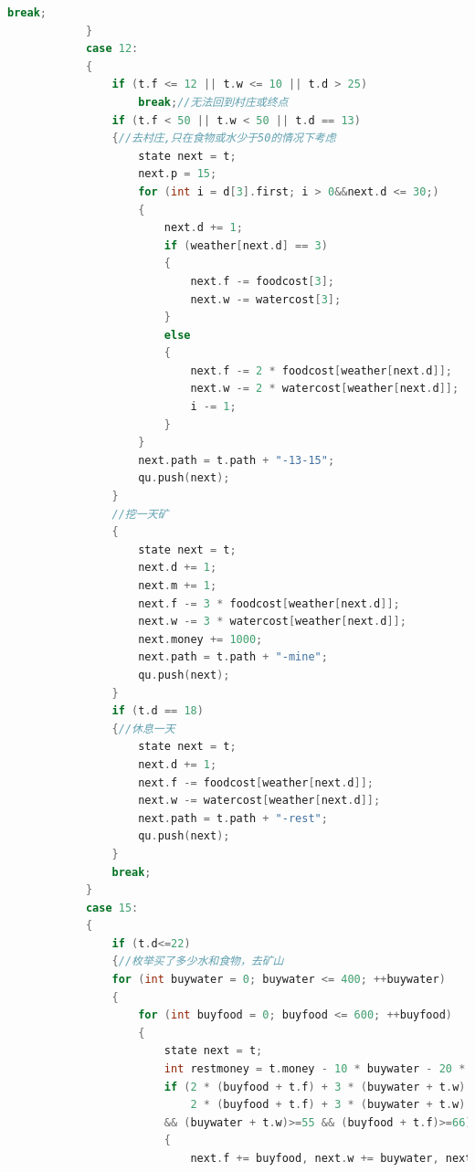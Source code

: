 \documentclass[withoutpreface,bwprint]{cumcmthesis} %
\begin{document}
\begin{appendices}
\begin{lstlisting}[language=c++]
                break;
            }
            case 12:
            {
                if (t.f <= 12 || t.w <= 10 || t.d > 25)
                    break;//无法回到村庄或终点
                if (t.f < 50 || t.w < 50 || t.d == 13)
                {//去村庄,只在食物或水少于50的情况下考虑
                    state next = t;
                    next.p = 15;
                    for (int i = d[3].first; i > 0&&next.d <= 30;)
                    {
                        next.d += 1;
                        if (weather[next.d] == 3)
                        {
                            next.f -= foodcost[3];
                            next.w -= watercost[3];
                        }
                        else
                        {
                            next.f -= 2 * foodcost[weather[next.d]];
                            next.w -= 2 * watercost[weather[next.d]];
                            i -= 1;
                        }
                    }
                    next.path = t.path + "-13-15";
                    qu.push(next);
                }
                //挖一天矿
                {
                    state next = t;
                    next.d += 1;
                    next.m += 1;
                    next.f -= 3 * foodcost[weather[next.d]];
                    next.w -= 3 * watercost[weather[next.d]];
                    next.money += 1000;
                    next.path = t.path + "-mine";
                    qu.push(next);
                }
                if (t.d == 18)
                {//休息一天
                    state next = t;
                    next.d += 1;
                    next.f -= foodcost[weather[next.d]];
                    next.w -= watercost[weather[next.d]];
                    next.path = t.path + "-rest";
                    qu.push(next);
                }
                break;
            }
            case 15:
            {
                if (t.d<=22)
                {//枚举买了多少水和食物，去矿山
                for (int buywater = 0; buywater <= 400; ++buywater)
                {
                    for (int buyfood = 0; buyfood <= 600; ++buyfood)
                    {
                        state next = t;
                        int restmoney = t.money - 10 * buywater - 20 * buyfood;
                        if (2 * (buyfood + t.f) + 3 * (buywater + t.w) >= 1199 &&
                            2 * (buyfood + t.f) + 3 * (buywater + t.w) <= 1200 && restmoney >= 0
                        && (buywater + t.w)>=55 && (buyfood + t.f)>=66)
                        {
                            next.f += buyfood, next.w += buywater, next.money = restmoney;

\end{lstlisting}
\end{appendices}
\end{document}
